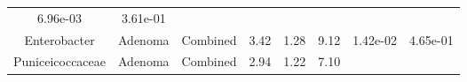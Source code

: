 \documentclass[12pt,]{article}
\begin{document}
\begin{longtable}[]{@{}cccccccc@{}}
\begin{minipage}[t]{0.06\columnwidth}
6.96e-03\strut
\end{minipage} & \begin{minipage}[t]{0.06\columnwidth}\centering\strut
3.61e-01\strut
\end{minipage}\tabularnewline
\begin{minipage}[t]{0.18\columnwidth}\centering\strut
Enterobacter\strut
\end{minipage} & \begin{minipage}[t]{0.07\columnwidth}\centering\strut
Adenoma\strut
\end{minipage} & \begin{minipage}[t]{0.09\columnwidth}\centering\strut
Combined\strut
\end{minipage} & \begin{minipage}[t]{0.03\columnwidth}\centering\strut
3.42\strut
\end{minipage} & \begin{minipage}[t]{0.14\columnwidth}\centering\strut
1.28\strut
\end{minipage} & \begin{minipage}[t]{0.14\columnwidth}\centering\strut
9.12\strut
\end{minipage} & \begin{minipage}[t]{0.06\columnwidth}\centering\strut
1.42e-02\strut
\end{minipage} & \begin{minipage}[t]{0.06\columnwidth}\centering\strut
4.65e-01\strut
\end{minipage}\tabularnewline
\begin{minipage}[t]{0.18\columnwidth}\centering\strut
Puniceicoccaceae\strut
\end{minipage} & \begin{minipage}[t]{0.07\columnwidth}\centering\strut
Adenoma\strut
\end{minipage} & \begin{minipage}[t]{0.09\columnwidth}\centering\strut
Combined\strut
\end{minipage} & \begin{minipage}[t]{0.03\columnwidth}\centering\strut
2.94\strut
\end{minipage} & \begin{minipage}[t]{0.14\columnwidth}\centering\strut
1.22\strut
\end{minipage} & \begin{minipage}[t]{0.14\columnwidth}\centering\strut
7.10\strut
\end{minipage} & \begin{minipage}[t]{0.06\columnwidth}\centering\strut

\end{minipage}
\end{longtable}
\end{document}
